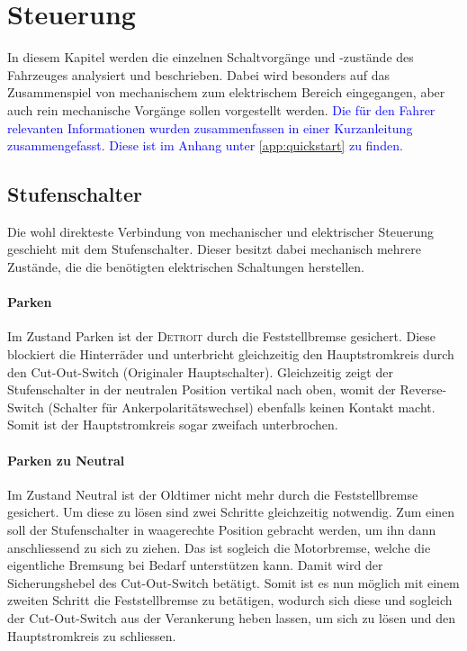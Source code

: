\section{Steuerung}
In diesem Kapitel werden die einzelnen Schaltvorgänge und -zustände des Fahrzeuges analysiert und beschrieben. Dabei wird besonders auf das Zusammenspiel von mechanischem zum elektrischem Bereich eingegangen, aber auch rein mechanische Vorgänge sollen vorgestellt werden. \textcolor{blue}{Die für den Fahrer relevanten Informationen wurden zusammenfassen in einer Kurzanleitung zusammengefasst. Diese ist im Anhang unter \ref{app:quickstart} zu finden.}

\subsection{Stufenschalter}
Die wohl direkteste Verbindung von mechanischer und elektrischer Steuerung geschieht mit dem Stufenschalter. Dieser besitzt dabei mechanisch mehrere Zustände, die die benötigten elektrischen Schaltungen herstellen.

\paragraph{Parken}
Im Zustand Parken ist der \textsc{Detroit} durch die Feststellbremse gesichert. Diese blockiert die Hinterräder und unterbricht gleichzeitig den Hauptstromkreis durch den Cut-Out-Switch (Originaler Hauptschalter). Gleichzeitig zeigt der Stufenschalter in der neutralen Position vertikal nach oben, womit der Reverse-Switch (Schalter für Ankerpolaritätswechsel) ebenfalls keinen Kontakt macht. Somit ist der Hauptstromkreis sogar zweifach unterbrochen.

\paragraph{Parken zu Neutral}
Im Zustand Neutral ist der Oldtimer nicht mehr durch die Feststellbremse gesichert. Um diese zu lösen sind zwei Schritte gleichzeitig notwendig. Zum einen soll der Stufenschalter in waagerechte Position gebracht werden, um ihn dann anschliessend zu sich zu ziehen. Das ist sogleich die Motorbremse, welche die eigentliche Bremsung bei Bedarf unterstützen kann. Damit wird der Sicherungshebel des Cut-Out-Switch betätigt. Somit ist es nun möglich mit einem zweiten Schritt die Feststellbremse zu betätigen, wodurch sich diese und sogleich der Cut-Out-Switch aus der Verankerung heben lassen, um sich zu lösen und den Hauptstromkreis zu schliessen.


